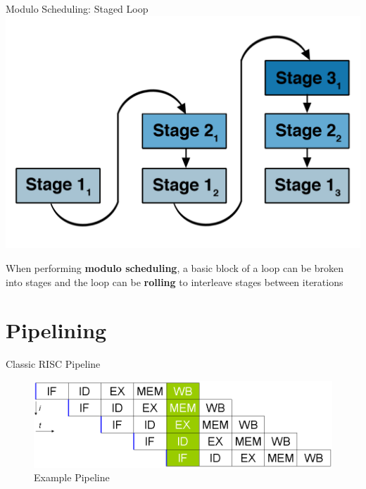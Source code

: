 \documentclass{beamer}
\begin{document}
\begin{darkframes}
\begin{frame}{Modulo Scheduling: Staged Loop}
  \includegraphics[scale=0.15]{figures/staging.png}

When performing {\bf \color{green} modulo scheduling}, a basic block of a loop can be broken
into stages and the loop can be {\bf \color{cyan} rolling} to interleave stages between
iterations
\end{frame}


\section{Pipelining}
\begin{frame}{Classic RISC Pipeline}
\begin{figure}
\includegraphics[scale=0.4]{figures/pipeline}
\caption{Example Pipeline}
\end{figure}
\end{frame}


\end{darkframes}
\end{document}
